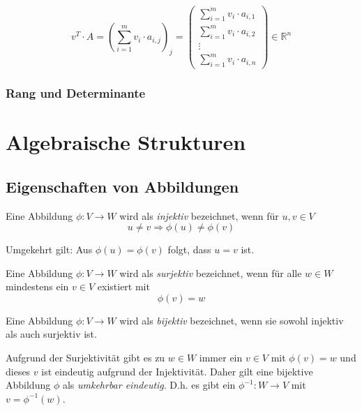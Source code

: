 \[
v^T \cdot A = (\sum_{i=1}^{m}v_i\cdot a_{i,j})_{j} = \begin{pmatrix}
\sum_{i=1}^{m}v_i\cdot a_{i,1} \\
\sum_{i=1}^{m}v_i\cdot a_{i,2} \\
\vdots \\
\sum_{i=1}^{m}v_i\cdot a_{i,n}
\end{pmatrix} \in \mathbb{R}^n
\]

\subsubsection{Rang und Determinante}

\begin{TODO}

\end{TODO}

\section{Algebraische Strukturen}

\begin{TODO}

\end{TODO}

\subsection{Eigenschaften von Abbildungen}


\begin{definition}\label{def:homo}
Eine Abbildung $\phi : V \longrightarrow W$ wird als \emph{injektiv} bezeichnet, wenn für $u,v \in V$ 
\[ u\ne v \Rightarrow \phi(u) \ne \phi(v) \]
\end{definition}
Umgekehrt gilt: Aus $\phi(u)=\phi(v)$ folgt, dass $u=v$ ist. 

\begin{definition}
Eine Abbildung $\phi : V \longrightarrow W$ wird als \emph{surjektiv} bezeichnet, wenn für alle $w\in W$ mindestens ein $v\in V$ existiert mit 
\[\phi(v) = w\]
\end{definition}

\begin{definition}
Eine Abbildung $\phi : V \longrightarrow W$ wird als \emph{bijektiv} bezeichnet, wenn sie sowohl injektiv als auch surjektiv ist. 
\end{definition}

Aufgrund der Surjektivität gibt es zu $w\in W$ immer ein $v\in V$  mit $\phi(v)=w$ und dieses $v$ ist eindeutig aufgrund der Injektivität. Daher gilt eine bijektive Abbildung $\phi$ als \emph{umkehrbar eindeutig}. D.h. es gibt ein $\phi^{-1} : W \longrightarrow V$ mit $v = \phi^{-1}(w)$.

